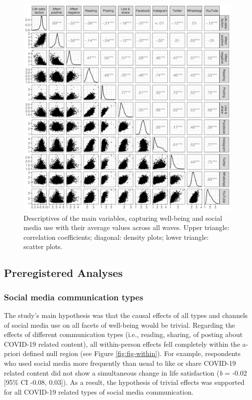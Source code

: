 \documentclass[
  man,floatsintext]{apa7}
\begin{document}
\begin{figure}
\includegraphics[width=\textwidth]{figures/fig_cor} \caption{Descriptives of the main variables, capturing well-being and social media use with their average values across all waves. Upper triangle: correlation coefficients; diagonal: density plots; lower triangle: scatter plots.}\label{fig:fig-correlations}
\end{figure}

\hypertarget{preregistered-analyses}{%
\subsection{Preregistered Analyses}\label{preregistered-analyses}}

\hypertarget{social-media-communication-types}{%
\subsubsection{Social media communication types}\label{social-media-communication-types}}

The study's main hypothesis was that the causal effects of all types and channels of social media use on all facets of well-being would be trivial.
Regarding the effects of different communication types (i.e., reading, sharing, of posting about COVID-19 related content), all within-person effects fell completely within the a-priori defined null region (see Figure \ref{fig:fig-within}).
For example, respondents who used social media more frequently than usual to like or share COVID-19 related content did not show a simultaneous change in life satisfaction (\emph{b} = -0.02 {[}95\% CI -0.08, 0.03{]}).
As a result, the hypothesis of trivial effects was supported for all COVID-19 related types of social media communication.
\end{document}
